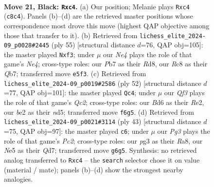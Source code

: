 \documentclass[11pt]{article}
\begin{document}
\clearpage

\begin{figure}[p]\centering
\begin{subfigure}{0.46\textwidth}\centering
\resizebox{\linewidth}{!}{%
\newchessgame
\chessboard[
  setfen={2r1r1k1/pp5p/3bpqp1/4n3/2N5/2Q3P1/PP2BP1P/R3R1K1 b - - 0 21},
  showmover=false,
  pgfstyle=straightmove, color=movearrow, markmove={c8-c4}
]}
\caption{}
\end{subfigure}\hfill
\begin{subfigure}{0.46\textwidth}\centering
\resizebox{\linewidth}{!}{%
\newchessgame
\chessboard[
  setfen={3r1rk1/1q4p1/1p2p2p/p1b1n3/5P1P/4pNPK/PP2Q3/1B3R1R b - - 1 28},
  showmover=false,
  pgfstyle=straightmove, color=movearrow, markmove={e5-f3}
]}
\caption{}
\end{subfigure}
\\[4pt]
\begin{subfigure}{0.46\textwidth}\centering
\resizebox{\linewidth}{!}{%
\newchessgame
\chessboard[
  setfen={4r1k1/1p2rp2/p1p3q1/3n2p1/4N3/6P1/PPQ1R1P1/4R1K1 w - - 0 27},
  showmover=false,
  pgfstyle=straightmove, color=movearrow, markmove={c2-c4}
]}
\caption{}
\end{subfigure}\hfill
\begin{subfigure}{0.46\textwidth}\centering
\resizebox{\linewidth}{!}{%
\newchessgame
\chessboard[
  setfen={r3r1k1/2pq1pp1/p5n1/1p1n1NB1/8/2P2Q1P/P4PP1/R2R2K1 b - - 9 22},
  showmover=false,
  pgfstyle=straightmove, color=movearrow, markmove={c7-c6}
]}
\caption{}
\end{subfigure}
\caption{\textbf{Move 21, Black: \texttt{Rxc4}.} (a) Our position; Melanie plays \texttt{Rxc4} (\texttt{c8c4}). Panels (b)--(d) are the retrieved master positions whose correspondence most drove this move (highest QAP objective among those that transfer to it). (b) Retrieved from \texttt{lichess\_elite\_2024-09\_p0028\#2445} (ply 55) [structural distance $d$=76, QAP obj=105]: the master played \texttt{Nxf3}; under $\mu$ our \emph{Ne4} plays the role of that game's \emph{Ne4}; cross-type roles: our \emph{P}b7 as their \emph{R}d8, our \emph{R}c8 as their \emph{Q}b7; transferred move \texttt{e5f3}. (c) Retrieved from \texttt{lichess\_elite\_2024-09\_p0019\#2586} (ply 52) [structural distance $d$=77, QAP obj=101]: the master played \texttt{Qc4}; under $\mu$ our \emph{Qf3} plays the role of that game's \emph{Qc2}; cross-type roles: our \emph{B}d6 as their \emph{R}e2, our \emph{b}e2 as their \emph{n}d5; transferred move \texttt{f6g5}. (d) Retrieved from \texttt{lichess\_elite\_2024-09\_p0021\#3114} (ply 43) [structural distance $d$=75, QAP obj=97]: the master played \texttt{c6}; under $\mu$ our \emph{Pg3} plays the role of that game's \emph{Pc2}; cross-type roles: our \emph{p}g3 as their \emph{R}a8, our \emph{N}e5 as their \emph{Q}d7; transferred move \texttt{g6g5}. Synthesis: no retrieved analog transferred to \texttt{Rxc4} -- the \texttt{search} selector chose it on value (material / mate); panels (b)--(d) show the strongest nearby analogies.}
\label{fig:thought-m41}
\end{figure}
\end{document}
